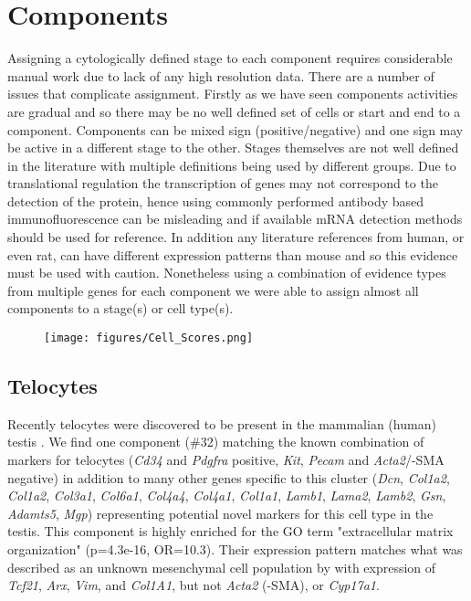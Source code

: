 \section{Components}

Assigning a cytologically defined stage to each component requires considerable manual work due to lack of any high resolution data. There are a number of issues that complicate assignment. Firstly as we have seen components activities are gradual and so there may be no well defined set of cells or start and end to a component. Components can be mixed sign (positive/negative) and one sign may be active in a different stage to the other. Stages themselves are not well defined in the literature with multiple definitions being used by different groups. Due to translational regulation the transcription of genes may not correspond to the detection of the protein, hence using commonly performed antibody based immunofluorescence can be misleading and if available mRNA detection methods should be used for reference. In addition any literature references from human, or even rat, can have different expression patterns than mouse and so this evidence must be used with caution. Nonetheless using a combination of evidence types from multiple genes for each component we were able to assign almost all components to a stage(s) or cell type(s).


\begin{figure}[H]
	\centering
	\texttt{[image: figures/Cell\_Scores.png]}
	\caption{}
	\label{fig:Cell_Scores}
\end{figure}




\subsection{Telocytes}
Recently telocytes were discovered to be present in the mammalian (human) testis \parencite{Marini2018Reappraising, Kuroda2004Distribution}. We find one component (\#32) matching the known combination of markers for telocytes (\textit{Cd34} and \textit{Pdgfra} positive, \textit{Kit}, \textit{Pecam} and \textit{Acta2}/\textalpha-SMA negative) in addition to many other genes specific to this cluster (\textit{Dcn}, \textit{Col1a2}, \textit{Col1a2}, \textit{Col3a1}, \textit{Col6a1}, \textit{Col4a4}, \textit{Col4a1}, \textit{Col1a1}, \textit{Lamb1}, \textit{Lama2}, \textit{Lamb2}, \textit{Gsn}, \textit{Adamts5}, \textit{Mgp}) representing potential novel markers for this cell type in the testis. This component is highly enriched for the GO term "extracellular matrix organization" (p=4.3e-16, OR=10.3). Their expression pattern matches what was described as an unknown mesenchymal cell population by \cite{Green2018Comprehensive} with expression of \textit{Tcf21}, \textit{Arx}, \textit{Vim}, and \textit{Col1A1}, but not \textit{Acta2} (\textalpha-SMA), or \textit{Cyp17a1}.


